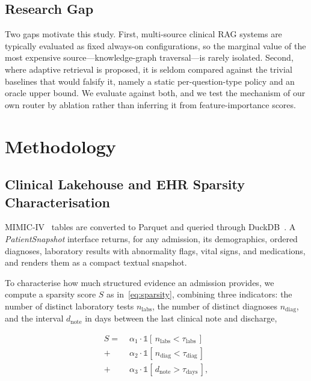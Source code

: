 \documentclass[conference]{IEEEtran}
\begin{document}
\subsection{Research Gap}

Two gaps motivate this study. First, multi-source clinical RAG systems
are typically evaluated as fixed always-on configurations, so the
marginal value of the most expensive source---knowledge-graph
traversal---is rarely isolated. Second, where adaptive retrieval is
proposed, it is seldom compared against the trivial baselines that
would falsify it, namely a static per-question-type policy and an
oracle upper bound. We evaluate against both, and we test the
mechanism of our own router by ablation rather than inferring it from
feature-importance scores.

\section{Methodology}

\subsection{Clinical Lakehouse and EHR Sparsity Characterisation}

MIMIC-IV~\cite{mimiciv2023} tables are converted to Parquet and queried
through DuckDB~\cite{duckdb2019}. A \textit{PatientSnapshot} interface
returns, for any admission, its demographics, ordered diagnoses,
laboratory results with abnormality flags, vital signs, and
medications, and renders them as a compact textual snapshot.

To characterise how much structured evidence an admission provides, we
compute a sparsity score $S$ as in~\eqref{eq:sparsity}, combining three
indicators: the number of distinct laboratory tests $n_{\text{labs}}$,
the number of distinct diagnoses $n_{\text{diag}}$, and the interval
$d_{\text{note}}$ in days between the last clinical note and
discharge,

\begin{equation}
\label{eq:sparsity}
\begin{split}
S = \; &\alpha_1 \cdot \mathbb{1}[\,n_{\text{labs}} < \tau_{\text{labs}}\,] \\
     + &\alpha_2 \cdot \mathbb{1}[\,n_{\text{diag}} < \tau_{\text{diag}}\,] \\
     + &\alpha_3 \cdot \mathbb{1}[\,d_{\text{note}} > \tau_{\text{days}}\,],
\end{split}
\end{equation}
\end{document}
